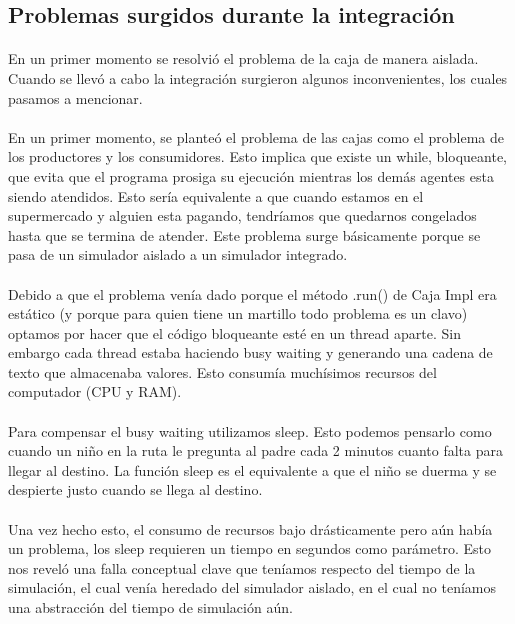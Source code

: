 \documentclass{article}
\begin{document}
\subsection{Problemas surgidos durante la integración}

\paragraph{}
En un primer momento se resolvió el problema de la caja de manera aislada. Cuando se llevó a cabo la integración surgieron algunos inconvenientes, los cuales pasamos a mencionar.

\paragraph{}
En un primer momento, se planteó el problema de las cajas como el problema de los productores y los consumidores. Esto implica que existe un while, bloqueante, que evita que el programa prosiga su ejecución mientras los demás agentes esta siendo atendidos. Esto sería equivalente a que cuando estamos en el supermercado y alguien esta pagando, tendríamos que quedarnos congelados hasta que se termina de atender. Este problema surge básicamente porque se pasa de un simulador aislado a un simulador integrado.

\paragraph{}
Debido a que el problema venía dado porque el método .run() de Caja Impl era estático (y porque para quien tiene un martillo todo problema es un clavo) optamos por hacer que el código bloqueante esté en un thread aparte. Sin embargo cada thread estaba haciendo busy waiting y generando una cadena de texto que almacenaba valores. Esto consumía muchísimos recursos del computador (CPU y RAM).

\paragraph{}
Para compensar el busy waiting utilizamos sleep. Esto podemos pensarlo como cuando un niño en la ruta le pregunta al padre cada 2 minutos cuanto falta para llegar al destino. La función sleep es el equivalente a que el niño se duerma y se despierte justo cuando se llega al destino.

\paragraph{}
Una vez hecho esto, el consumo de recursos bajo drásticamente pero aún había un problema, los sleep requieren un tiempo en segundos como parámetro. Esto nos reveló una falla conceptual clave que teníamos respecto del tiempo de la simulación, el cual venía heredado del simulador aislado, en el cual no teníamos una abstracción del tiempo de simulación aún.
\end{document}
